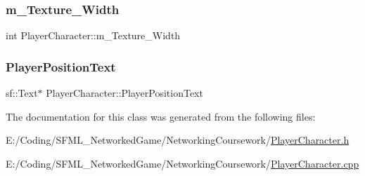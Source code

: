 \subsubsection{\texorpdfstring{m\+\_\+\+Texture\+\_\+\+Width}{m\_Texture\_Width}}
{\footnotesize\ttfamily int Player\+Character\+::m\+\_\+\+Texture\+\_\+\+Width\hspace{0.3cm}{\ttfamily [protected]}}

\hypertarget{class_player_character_afd9f0e8831f894c5e621543ed3ff3d9c}{}\label{class_player_character_afd9f0e8831f894c5e621543ed3ff3d9c} 
\subsubsection{\texorpdfstring{Player\+Position\+Text}{PlayerPositionText}}
{\footnotesize\ttfamily sf\+::\+Text$\ast$ Player\+Character\+::\+Player\+Position\+Text\hspace{0.3cm}{\ttfamily [protected]}}



The documentation for this class was generated from the following files\+:\begin{DoxyCompactItemize}
\item 
E\+:/\+Coding/\+S\+F\+M\+L\+\_\+\+Networked\+Game/\+Networking\+Coursework/\hyperlink{_player_character_8h}{Player\+Character.\+h}\item 
E\+:/\+Coding/\+S\+F\+M\+L\+\_\+\+Networked\+Game/\+Networking\+Coursework/\hyperlink{_player_character_8cpp}{Player\+Character.\+cpp}\end{DoxyCompactItemize}
